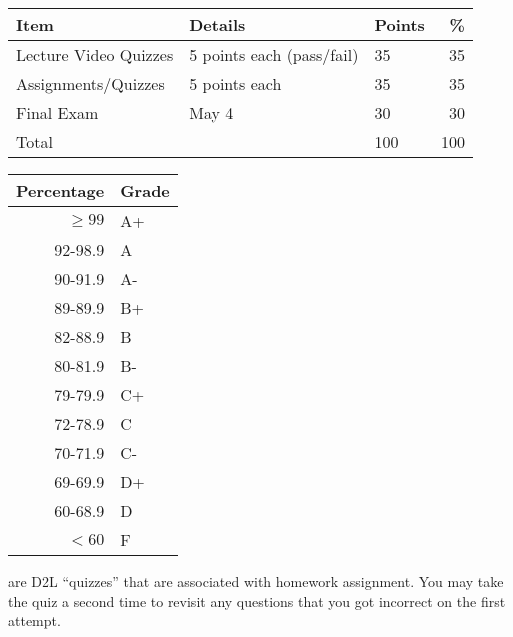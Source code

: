 \documentclass{tufte-handout}
\begin{document}
\begin{table}
\begin{tabular}{l l l r}
Item & Details & Points &  \% \\
\hline
Lecture Video Quizzes & 5 points each (pass/fail) & 35 & 35 \\
Assignments/Quizzes  &  5 points each & 35 & 35\\
Final Exam & May 4 & 30 & 30 \\
\hline
Total & & 100 & 100 
\end{tabular}
\end{table}













\begin{margintable}
\begin{tabular}{rl}
Percentage & Grade \\
\hline 
$\ge99$ & A+ \\
92-98.9 & A \\
90-91.9 & A- \\
89-89.9 & B+ \\
82-88.9 & B \\
80-81.9 & B- \\
79-79.9 & C+ \\
72-78.9 & C \\
70-71.9 & C- \\
69-69.9 & D+ \\
60-68.9 & D \\
$<60$ & F \\
\hline
\end{tabular}
\end{margintable}



  are D2L ``quizzes'' that are associated with homework assignment. You may take the quiz a second time to revisit any questions that you got incorrect on the first attempt.
\end{document}
